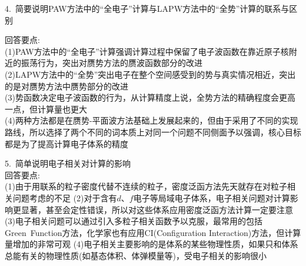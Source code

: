 4.~简要说明\textrm{PAW}方法中的``全电子''计算与\textrm{LAPW}方法中的``全势''计算的联系与区别

{\heiti 回答要点:}\\
(1)\textrm{PAW}方法中的``全电子''计算强调计算过程中保留了电子波函数在靠近原子核附近的振荡行为，突出对赝势方法的赝波函数部分的改进\\
(2)\textrm{LAPW}方法中的``全势''突出电子在整个空间感受到的势与真实情况相近，突出的是对赝势方法中赝势部分的改进\\
(3)势函数决定电子波函数的行为，从计算精度上说，全势方法的精确程度会更高一点，但计算量也更大\\
(4)两种方法都是在赝势-平面波方法基础上发展起来的，但由于采用了不同的实现路线，所以选择了两个不同的词本质上对同一个问题不同侧面予以强调，核心目标都是为了提高计算电子体系的精度

5.~简单说明电子相关对计算的影响\\

{\heiti 回答要点:}\\
(1)由于用联系的粒子密度代替不连续的粒子，密度泛函方法先天就存在对粒子相关问题考虑的不足
(2)对于含有$d$、$f$电子等局域电子体系，电子相关问题对计算影响更显著，甚至会定性错误，所以对这些体系应用密度泛函方法计算一定要注意
(3)电子相关问题可以通过引入多粒子相关函数予以克服，最常用的包括\textrm{Green~Function}方法，化学家也有应用\textrm{CI(Configuration Interaction)}方法，但计算量增加的非常可观
(4)电子相关主要影响的是体系的某些物理性质，如果只和体系总能有关的物理性质(如基态体积、体弹模量等)，受电子相关的影响很小
